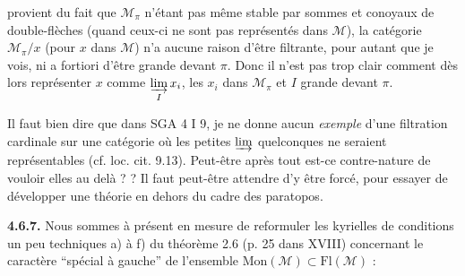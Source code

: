 \documentclass[11pt]{article}
\newcommand{\printedpage}[1]{\marginpar{\footnotesize p.~#1}}
\newcommand{\msp}[1]{\marginpar{\footnotesize [#1]}}
\newcommand{\Mc}{\mathcal{M}}
\begin{document}
\msp{page 156}

provient du fait que $\Mc_{\pi}$ n'étant pas même stable par sommes et conoyaux de double-flèches (quand ceux-ci ne sont pas représentés dans $\Mc$), la catégorie $\Mc_{\pi}/x$ (pour $x$ dans $\Mc$) n'a aucune raison d'être filtrante, pour autant que je vois, ni a fortiori
\printedpage{51}
d'être grande devant $\pi$. Donc il n'est pas trop clair comment dès lors représenter $x$ comme $\varinjlim\limits_{I} x_i$, les $x_i$ dans $\Mc_{\pi}$ et $I$ grande devant $\pi$.

Il faut bien dire que dans SGA 4 I 9, je ne donne aucun \textit{exemple} d'une filtration cardinale sur une catégorie où les petites $\varinjlim$ quelconques ne seraient représentables (cf. loc. cit. 9.13). Peut-être après tout est-ce contre-nature de vouloir elles au delà ? ? Il faut peut-être attendre d'y être forcé, pour essayer de développer une théorie en dehors du cadre des paratopos.

\msp{page 157}

\textbf{4.6.7.} Nous sommes à présent en mesure de reformuler les kyrielles de conditions un peu techniques a) à f) du théorème 2.6 (p. 25 dans XVIII) concernant le caractère “spécial à gauche” de l'ensemble $\mathrm{Mon}(\Mc) \subset \mathrm{Fl}(\Mc)$ :
\end{document}
